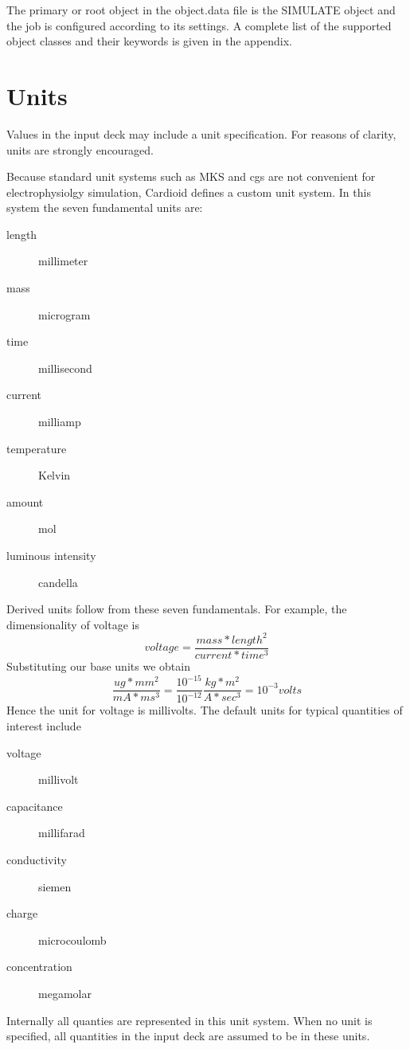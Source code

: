 \documentclass{article}
\begin{document}
The primary or root object in the object.data file is the SIMULATE
object and the job is configured according to its settings.  A complete
list of the supported object classes and their keywords is given in the
appendix.

\section{Units}

Values in the input deck may include a unit specification.  For reasons
of clarity, units are strongly encouraged.  

Because standard unit systems such as MKS and cgs are not convenient for
electrophysiolgy simulation, Cardioid defines a custom unit system.
In this system the seven fundamental units are:
\begin{description}
\item[length] millimeter
\item[mass]   microgram
\item[time] millisecond
\item[current] milliamp
\item[temperature] Kelvin
\item[amount] mol
\item[luminous intensity] candella
\end{description}
Derived units follow from these seven fundamentals.  For example, the
dimensionality of voltage is 
\[
voltage = \frac{mass * length^2}{current * time^3} 
\]
Substituting our base units we obtain
\[
\frac{ug*mm^2}{mA*ms^3} = \frac{10^{-15}}{10^{-12}}\frac{kg*m^2}{A*sec^3} =
10^{-3}volts
\]
Hence the unit for voltage is millivolts.  The default units for typical
quantities of interest include
\begin{description}
\item[voltage] millivolt
\item[capacitance] millifarad
\item[conductivity] siemen
\item[charge] microcoulomb
\item[concentration] megamolar
\end{description}
Internally all quanties are represented in this unit system.  When no
unit is specified, all quantities in the input deck are assumed to be in
these units.  
\end{document}

